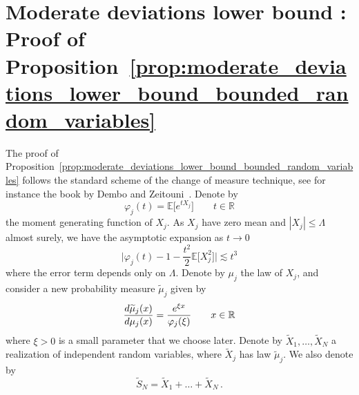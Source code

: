 \documentclass[11pt]{amsart}
\theoremstyle{definition}
\theoremstyle{remark}
\numberwithin{equation}{section}
\def\La{{\Lambda}}
\newcommand{\bR}{\mathbb R}
\newcommand{\bE}{\mathbb E}
\begin{document}
	\section{Moderate deviations lower bound : Proof of Proposition~\ref{prop:moderate_deviations_lower_bound_bounded_random_variables}}
	\label{sec:moderate_deviations_lower_bound}
	The proof of Proposition~\ref{prop:moderate_deviations_lower_bound_bounded_random_variables} follows the standard scheme of the change of measure technique, see for instance the book by Dembo and Zeitouni~\cite{DemboZeitouniLDP}. Denote by
	\[
	\varphi_j (t) = \bE \big[e^{tX_j}\big] \qquad t\in \bR 
	\]
	the moment generating function of $X_j$. As $X_j$ have zero mean and $|X_j| \le \La$ almost surely, we have the asymptotic expansion as $t\to 0$
	\begin{equation}
		\label{eq:expansion_of_generating_function}
		\big|\varphi_j(t) - 1 - \frac{t^2}{2} \bE\big[X_j^2\big]\big| \lesssim  t^3
	\end{equation}
	where the error term depends only on $\La$. Denote by $\mu_j$ the law of $X_j$, and consider a new probability measure $\widetilde{\mu}_j$ given by
	\begin{equation}
		\label{eq:def_of_tilted_measure}
		\frac{{\rm d} \widetilde{\mu}_j(x)}{{\rm d}\mu_j (x)} = \frac{e^{\xi x}}{\varphi_j(\xi)} \qquad x\in \bR 
	\end{equation}
	where $\xi>0$ is a small parameter that we choose later. Denote by $\widetilde{X}_1,\ldots,\widetilde{X}_N$ a realization of independent random variables, where $\widetilde{X}_j$ has law $\widetilde{\mu}_j$. We also denote by $$\widetilde{S}_N = \widetilde{X}_1+\ldots+\widetilde{X}_N \, .$$	
\end{document}
